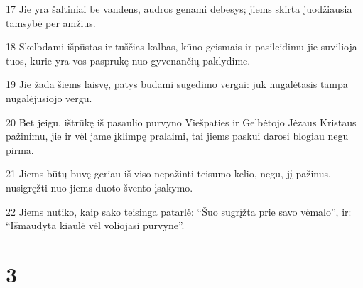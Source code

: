 \par 17 Jie yra šaltiniai be vandens, audros genami debesys; jiems skirta juodžiausia tamsybė per amžius. 
\par 18 Skelbdami išpūstas ir tuščias kalbas, kūno geismais ir pasileidimu jie suvilioja tuos, kurie yra vos pasprukę nuo gyvenančių paklydime. 
\par 19 Jie žada šiems laisvę, patys būdami sugedimo vergai: juk nugalėtasis tampa nugalėjusiojo vergu. 
\par 20 Bet jeigu, ištrūkę iš pasaulio purvyno Viešpaties ir Gelbėtojo Jėzaus Kristaus pažinimu, jie ir vėl jame įklimpę pralaimi, tai jiems paskui darosi blogiau negu pirma. 
\par 21 Jiems būtų buvę geriau iš viso nepažinti teisumo kelio, negu, jį pažinus, nusigręžti nuo jiems duoto švento įsakymo. 
\par 22 Jiems nutiko, kaip sako teisinga patarlė: “Šuo sugrįžta prie savo vėmalo”, ir: “Išmaudyta kiaulė vėl voliojasi purvyne”.


\chapter{3}


